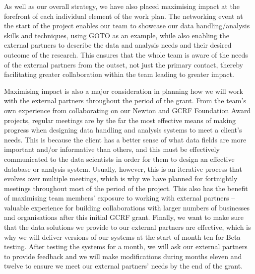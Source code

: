\documentclass[11pt]{article}
\begin{document}
  \vspace{2mm}
  \noindent
  As well as our overall strategy, we have also placed maximising impact at the forefront of each individual element of the work plan. The networking event at the start of the project enables our team to showcase our data handling/analysis skills and techniques, using GOTO as an example, while also enabling the external partners to describe the data and analysis needs and their desired outcome of the research. This ensures that the whole team is aware of the needs of the external partners from the outset, not just the primary contact, thereby facilitating greater collaboration within the team leading to greater impact.
  
  \vspace{2mm}
  \noindent
  Maximising impact is also a major consideration in planning how we will work with the external partners throughout the period of the grant. From the team's own experience from collaborating on our Newton and GCRF Foundation Award projects, regular meetings are by the far the most effective means of making progress when designing data handling and analysis systems to meet a client's needs. This is because the client has a better sense of what data fields are more important and/or informative than others, and this must be effectively communicated to the data scientists in order for them to design an effective database or analysis system. Usually, however, this is an iterative process that evolves over multiple meetings, which is why we have planned for fortnightly meetings throughout most of the period of the project. This also has the benefit of maximising team members' exposure to working with external partners -- valuable experience for building collaborations with larger numbers of businesses and organisations after this initial GCRF grant. Finally, we want to make sure that the data solutions we provide to our external partners are effective, which is why we will deliver versions of our systems at the start of month ten for Beta testing. After testing the systems for a month, we will ask our external partners to provide feedback and we will make modifications during months eleven and twelve to ensure we meet our external partners' needs by the end of the grant. 
  
\end{document}
